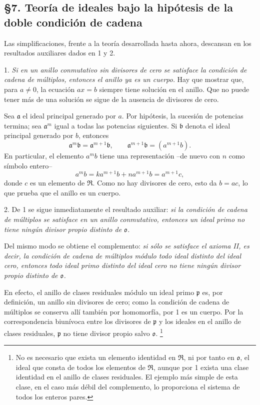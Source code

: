 \documentclass[11pt]{article}
\providecommand{\mR}{\mathfrak{R}}
\providecommand{\ma}{\mathfrak{a}}
\providecommand{\mb}{\mathfrak{b}}
\providecommand{\mo}{\mathfrak{o}}
\providecommand{\mpideal}{\mathfrak{p}}
\begin{document}
\subsection*{§7. Teoría de ideales bajo la hipótesis de la doble condición de cadena}

Las simplificaciones, frente a la teoría desarrollada hasta ahora, descansan en los resultados auxiliares dados en 1 y 2.

1. \emph{Si en un anillo conmutativo sin divisores de cero se satisface la condición de cadena de múltiplos, entonces el anillo ya es un cuerpo.} Hay que mostrar que, para $a\ne0$, la ecuación $ax=b$ siempre tiene solución en el anillo. Que no puede tener más de una solución se sigue de la ausencia de divisores de cero.

Sea $\ma$ el ideal principal generado por $a$. Por hipótesis, la sucesión de potencias termina; sea $\ma^m$ igual a todas las potencias siguientes. Si $\mb$ denota el ideal principal generado por $b$, entonces
\[
        \ma^m\mb=\ma^{m+1}\mb,
        \qquad \ma^{m+1}\mb=(a^{m+1}b).
\]
En particular, el elemento $a^m b$ tiene una representación --de nuevo con $n$ como símbolo entero--
\[
        a^m b=k a^{m+1}b+n a^{m+1}b=a^{m+1}c,
\]
donde $c$ es un elemento de $\mR$. Como no hay divisores de cero, esto da $b=ac$, lo que prueba que el anillo es un cuerpo.

2. De 1 se sigue inmediatamente el resultado auxiliar: \emph{si la condición de cadena de múltiplos se satisface en un anillo conmutativo, entonces un ideal primo no tiene ningún divisor propio distinto de $\mo$.}

Del mismo modo se obtiene el complemento: \emph{si sólo se satisface el axioma II, es decir, la condición de cadena de múltiplos módulo todo ideal distinto del ideal cero, entonces todo ideal primo distinto del ideal cero no tiene ningún divisor propio distinto de $\mo$.}

En efecto, el anillo de clases residuales módulo un ideal primo $\mpideal$ es, por definición, un anillo sin divisores de cero; como la condición de cadena de múltiplos se conserva allí también por homomorfía, por 1 es un cuerpo. Por la correspondencia biunívoca entre los divisores de $\mpideal$ y los ideales en el anillo de clases residuales, $\mpideal$ no tiene divisor propio salvo $\mo$.
\footnote{No es necesario que exista un elemento identidad en $\mR$, ni por tanto en $\mo$, el ideal que consta de todos los elementos de $\mR$, aunque por 1 exista una clase identidad en el anillo de clases residuales. El ejemplo más simple de esta clase, en el caso más débil del complemento, lo proporciona el sistema de todos los enteros pares.}
\end{document}
